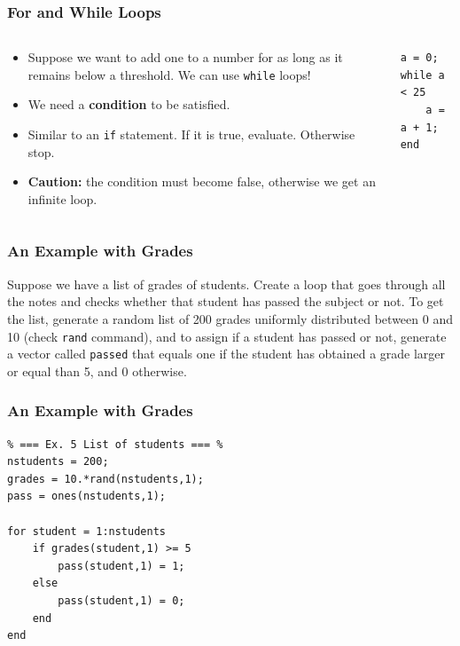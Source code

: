 \documentclass[11pt,xcolor={svgnames},aspectratio=169,usepdftitle=false,notheorems]{beamer}
\begin{document}
\begin{frame}[fragile]
    \frametitle{For and While Loops}
\begin{columns}
    \begin{column}{0.6\textwidth}
        \begin{itemize}
            \item Suppose we want to add one to a number for as long as it remains below a threshold. We can use \verb;while; loops!
            \item We need a \alert{\textbf{condition}} to be satisfied.
            \item Similar to an \verb;if; statement. If it is true, evaluate. Otherwise stop.
            \item \alert{\textbf{Caution:}} the condition must become false, otherwise we get an infinite loop.
        \end{itemize}
    \end{column}
    \begin{column}{0.4\textwidth}
\begin{lstlisting}
a = 0;
while a < 25
    a = a + 1;
end
\end{lstlisting}
    \end{column}
\end{columns}
\end{frame}

\begin{frame}[fragile]
    \frametitle{An Example with Grades}
\begin{exercise}
Suppose we have a list of grades of students. Create a loop that goes through all the notes and checks whether that student has passed the subject or not. To get the list, generate a random list of 200 grades uniformly distributed between 0 and 10 (check \verb;rand; command), and to assign if a student has passed or not, generate a vector called \verb;passed; that equals one if the student has obtained a grade larger or equal than 5, and 0 otherwise.
\end{exercise}
\end{frame}

\begin{frame}[fragile]
    \frametitle{An Example with Grades}
\begin{lstlisting}
% === Ex. 5 List of students === %
nstudents = 200;
grades = 10.*rand(nstudents,1);
pass = ones(nstudents,1);
    
for student = 1:nstudents
    if grades(student,1) >= 5
        pass(student,1) = 1;
    else
        pass(student,1) = 0;
    end
end
\end{lstlisting}
\end{frame}
\end{document}
